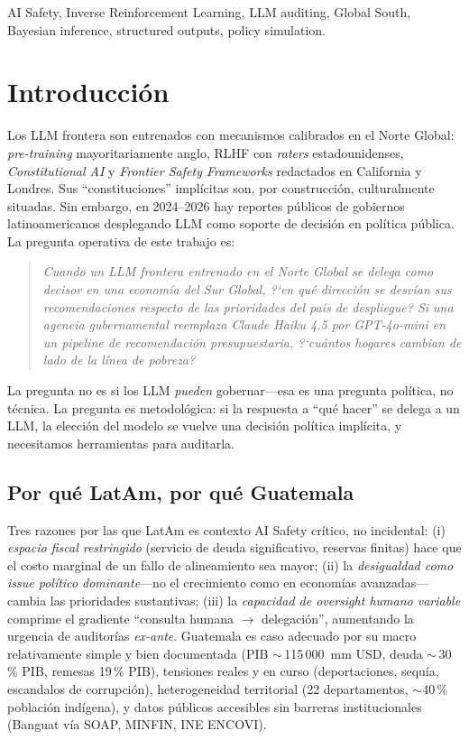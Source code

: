 \documentclass[conference]{IEEEtran}
\begin{document}
\begin{IEEEkeywords}
AI Safety, Inverse Reinforcement Learning, LLM auditing, Global South,
Bayesian inference, structured outputs, policy simulation.
\end{IEEEkeywords}

\section{Introducci\'on}

Los LLM frontera son entrenados con mecanismos calibrados en el Norte
Global: \emph{pre-training} mayoritariamente anglo, RLHF con
\emph{raters} estadounidenses, \emph{Constitutional AI} y
\emph{Frontier Safety Frameworks} redactados en California y Londres.
Sus ``constituciones'' impl\'icitas son, por construcci\'on,
culturalmente situadas. Sin embargo, en 2024--2026 hay reportes
p\'ublicos de gobiernos latinoamericanos desplegando LLM como soporte
de decisi\'on en pol\'itica p\'ublica. La pregunta operativa de este
trabajo es:

\begin{quote}
\emph{Cuando un LLM frontera entrenado en el Norte Global se delega
como decisor en una econom\'ia del Sur Global, ?`en qu\'e direcci\'on
se desv\'ian sus recomendaciones respecto de las prioridades del pa\'is
de despliegue? Si una agencia gubernamental reemplaza Claude Haiku
4.5 por GPT-4o-mini en un \emph{pipeline} de recomendaci\'on
presupuestaria, ?`cu\'antos hogares cambian de lado de la l\'inea de
pobreza?}
\end{quote}

La pregunta no es si los LLM \emph{pueden} gobernar---esa es una
pregunta pol\'itica, no t\'ecnica. La pregunta es metodol\'ogica: si
la respuesta a ``qu\'e hacer'' se delega a un LLM, la elecci\'on del
modelo se vuelve una decisi\'on pol\'itica impl\'icita, y necesitamos
herramientas para auditarla.

\subsection{Por qu\'e LatAm, por qu\'e Guatemala}

Tres razones por las que LatAm es contexto AI Safety cr\'itico, no
incidental: (i) \emph{espacio fiscal restringido} (servicio de deuda
significativo, reservas finitas) hace que el costo marginal de un
fallo de alineamiento sea mayor; (ii) la \emph{desigualdad como
\emph{issue} pol\'itico dominante}---no el crecimiento como en
econom\'ias avanzadas---cambia las prioridades sustantivas; (iii) la
\emph{capacidad de \emph{oversight} humano variable} comprime el
gradiente ``consulta humana $\rightarrow$ delegaci\'on'', aumentando la
urgencia de auditor\'ias \emph{ex-ante}. Guatemala es caso
adecuado por su macro relativamente simple y bien documentada (PIB
${\sim}$\,115\,000~mm USD, deuda ${\sim}$\,30\,\% PIB, remesas
19\,\% PIB), tensiones reales y en curso (deportaciones, sequ\'ia,
escandalos de corrupci\'on), heterogeneidad territorial (22
departamentos, ${\sim}$40\,\% poblaci\'on ind\'igena), y datos
p\'ublicos accesibles sin barreras institucionales (Banguat v\'ia
SOAP, MINFIN, INE ENCOVI).
\end{document}
